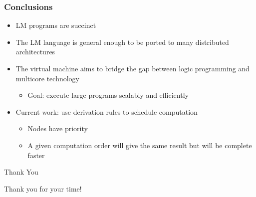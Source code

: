 \documentclass{beamer}
\begin{document}
\begin{frame}
   \frametitle{Conclusions}
   \begin{itemize}
      \item LM programs are succinct
      \item The LM language is general enough to be ported to many distributed architectures
      \item The virtual machine aims to bridge the gap between logic programming and multicore technology
      \begin{itemize}
         \item Goal: execute large programs scalably and efficiently
      \end{itemize}
      \item Current work: use derivation rules to schedule computation
      \begin{itemize}
         \item Nodes have priority
         \item A given computation order will give the same result but will be complete faster
      \end{itemize}
   \end{itemize}
\end{frame}


\begin{frame}{Thank You}
\begin{center}
{\Huge Thank you for your time!}
\end{center}
\end{frame}
\end{document}
